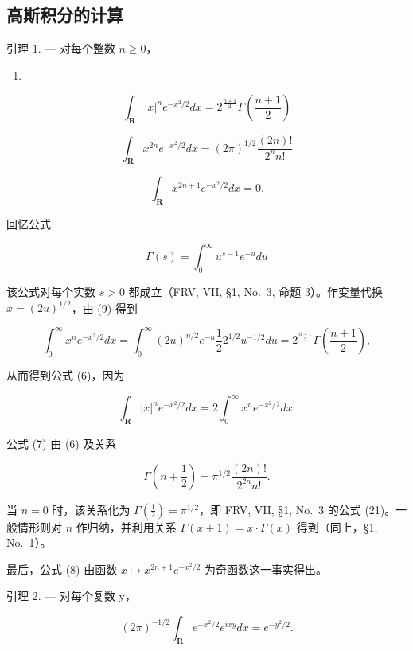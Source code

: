 \subsection{高斯积分的计算}

引理 1. --- 对每个整数 \(n \geqslant 0\)，

\begin{enumerate}
\def\labelenumi{(\arabic{enumi})}
\setcounter{enumi}{5}
\tightlist
\item
\end{enumerate}

\[
\int_ {\mathbf {R}} | x | ^ {n} e ^ {- x ^ {2} / 2} d x = 2 ^ {\frac {n + 1}{2}} \Gamma \left(\frac {n + 1}{2}\right)\tag{7}
\]

\[
\int_ {\mathbf {R}} x ^ {2 n} e ^ {- x ^ {2} / 2} d x = (2 \pi) ^ {1 / 2} \frac {(2 n) !}{2 ^ {n} n !}\tag{8}
\]

\[
\int_ {\mathbf {R}} x ^ {2 n + 1} e ^ {- x ^ {2} / 2} d x = 0.
\]

回忆公式

\[
\Gamma (s) = \int_ {0} ^ {\infty} u ^ {s - 1} e ^ {- u} d u\tag{9}
\]

该公式对每个实数 \(s > 0\) 都成立（FRV, VII, §1, No.~3, 命题 3）。作变量代换 \(x = (2u)^{1/2}\)，由 (9) 得到

\[
\int_ {0} ^ {\infty} x ^ {n} e ^ {- x ^ {2} / 2} d x = \int_ {0} ^ {\infty} (2 u) ^ {n / 2} e ^ {- u} \frac {1}{2} 2 ^ {1 / 2} u ^ {- 1 / 2} d u = 2 ^ {\frac {n - 1}{2}} \Gamma \left(\frac {n + 1}{2}\right),
\]

从而得到公式 (6)，因为

\[
\int_ {\mathbf {R}} | x | ^ {n} e ^ {- x ^ {2} / 2} d x = 2 \int_ {0} ^ {\infty} x ^ {n} e ^ {- x ^ {2} / 2} d x.
\]

公式 (7) 由 (6) 及关系

\[
\Gamma \left(n + \frac {1}{2}\right) = \pi^ {1 / 2} \frac {(2 n) !}{2 ^ {2 n} n !}.\tag{10}
\]

当 \(n = 0\) 时，该关系化为 \(\Gamma(\frac{1}{2}) = \pi^{1/2}\)，即 FRV, VII, §1, No.~3 的公式 (21)。一般情形则对 \(n\) 作归纳，并利用关系 \(\Gamma(x + 1) = x \cdot \Gamma(x)\) 得到（同上，§1, No.~1）。

最后，公式 (8) 由函数 \(x \mapsto x^{2n+1}e^{-x^2/2}\) 为奇函数这一事实得出。

引理 2. --- 对每个复数 y，

\[
(2 \pi) ^ {- 1 / 2} \int_ {\mathbf {R}} e ^ {- x ^ {2} / 2} e ^ {i x y} d x = e ^ {- y ^ {2} / 2}.\tag{11}
\]

